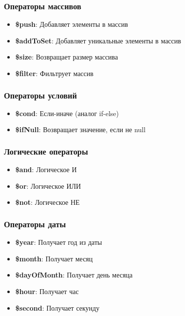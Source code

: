 \documentclass[a4paper,12pt]{article}
\begin{document}
\subsubsection{Операторы массивов}
\begin{itemize}[noitemsep]
    \item \textbf{\$push}: Добавляет элементы в массив
    \item \textbf{\$addToSet}: Добавляет уникальные элементы в массив
    \item \textbf{\$size}: Возвращает размер массива
    \item \textbf{\$filter}: Фильтрует массив
\end{itemize}

\subsubsection{Операторы условий}
\begin{itemize}[noitemsep]
    \item \textbf{\$cond}: Если-иначе (аналог if-else)
    \item \textbf{\$ifNull}: Возвращает значение, если не null
\end{itemize}

\subsubsection{Логические операторы}
\begin{itemize}[noitemsep]
    \item \textbf{\$and}: Логическое И
    \item \textbf{\$or}: Логическое ИЛИ
    \item \textbf{\$not}: Логическое НЕ
\end{itemize}

\subsubsection{Операторы даты}
\begin{itemize}[noitemsep]
    \item \textbf{\$year}: Получает год из даты
    \item \textbf{\$month}: Получает месяц
    \item \textbf{\$dayOfMonth}: Получает день месяца
    \item \textbf{\$hour}: Получает час
    \item \textbf{\$second}: Получает секунду
\end{itemize}
\end{document}
